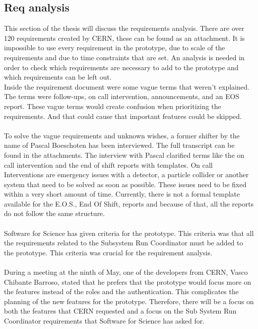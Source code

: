 \documentclass[paper=a4, fontsize=11pt,twoside]{scrartcl}	%
\begin{document}
\newpage
\subsection{Req analysis}
This section of the thesis will discuss the requirements analysis. There are over 120 requirements created by CERN, these can be found as an attachment. It is impossible to use every requirement in the prototype, due to scale of the requirements and due to time constraints that are set. An analysis is needed in order to check which requirements are necessary to add to the prototype and which requirements can be left out.  \\
Inside the requirement document were some vague terms that weren't explained. The terms were follow-ups, on call intervention, announcements, and an EOS report. These vague terms would create confusion when prioritizing the requirements. And that could cause that important features could be skipped. \\ \\
To solve the vague requirements and unknown wishes, a former shifter by the name of Pascal Boeschoten has been interviewed. The full transcript can be found in the attachments. The interview with Pascal clarified  terms like the on call intervention and the end of shift reports with templates. On call Interventions are emergency issues with a detector, a particle collider or another system that need to be solved as soon as possible. These issues need to be fixed within a very short amount of time. Currently, there is not a formal template available for the E.O.S., End Of Shift, reports  and because of that, all the reports do not follow the same structure.\\ \\
Software for Science has given criteria for the prototype. This criteria was that all the requirements related to the Subsystem Run Coordinator must be added to the prototype. This criteria was crucial for the requirement analysis. \\ \\
During a meeting at the ninth of May, one of the developers from CERN, Vasco Chibante Barroso, stated that he prefers that the prototype would focus more on the features instead of the roles and the authentication. This complicates the planning of the new features for the prototype. Therefore, there will be a focus on both the features that CERN requested and a focus on the Sub System Run Coordinator requirements that Software for Science has asked for. \\  \\
\end{document}
